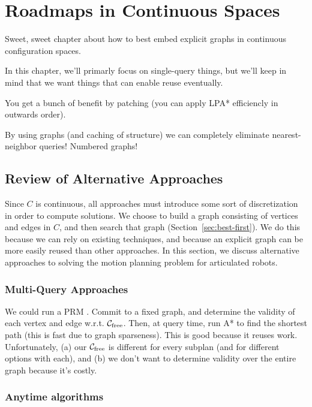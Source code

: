 \chapter{Roadmaps in Continuous Spaces}
\label{chap:graphs-in-continuous}

Sweet, sweet chapter about how to best embed explicit graphs
in continuous configuration spaces.

In this chapter,
we'll primarly focus on single-query things,
but we'll keep in mind that we want things that can enable reuse eventually.

You get a bunch of benefit by patching
(you can apply LPA* efficiencly in outwards order).

By using graphs (and caching of structure)
we can completely eliminate nearest-neighbor queries!
Numbered graphs!

\section{Review of Alternative Approaches}
\label{sec:related-work}

Since $C$ is continuous,
all approaches must introduce some sort of discretization
in order to compute solutions.
We choose to build a graph consisting of vertices and edges in $C$,
and then search that graph (Section~\ref{sec:best-first}).
We do this because we can rely on existing techniques,
and because an explicit graph can be more easily reused than other
approaches.
In this section, we discuss alternative approaches to solving
the motion planning problem for articulated robots.

\subsection{Multi-Query Approaches}

We could run a PRM \cite{kavrakietal1996prm}.
Commit to a fixed graph,
and determine the validity of each vertex and edge w.r.t.
$\mathcal{C}_{\mbox{\scriptsize free}}$.
Then, at query time,
run A* to find the shortest path (this is fast due to graph sparseness).
This is good because it reuses work.
Unfortunately,
(a) our $\mathcal{C}_{\mbox{\scriptsize free}}$
is different for every subplan
(and for different options with each),
and (b) we don't want to determine validity over the entire graph
because it's costly.

\subsection{Anytime algorithms}

